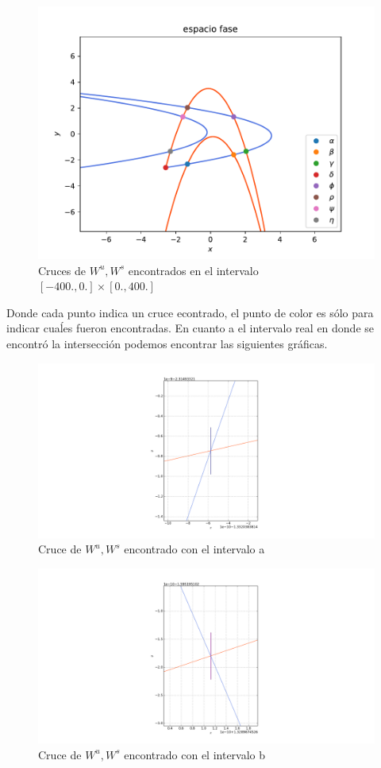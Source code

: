 \begin{figure}[H]
\centering
\includegraphics[scale=0.5]{crucesL}
\caption{Cruces de $W^{u},W^{s}$ encontrados en el intervalo $[-400.,0.] \times [0.,400.]$ }
\label{cruces}
\end{figure}

Donde cada punto indica un cruce econtrado, el punto de color es sólo para indicar cuaĺes fueron encontradas. En cuanto a el intervalo real en donde se encontró la intersección podemos encontrar las siguientes gráficas.


\begin{figure}[H]
\centering
\includegraphics[scale=0.4]{cruce1}
\caption{Cruce de $W^{u},W^{s}$ encontrado con el intervalo a}
\label{cruce1}
\end{figure}

\begin{figure}[H]
\centering
\includegraphics[scale=0.4]{cruce2}
\caption{Cruce de $W^{u},W^{s}$ encontrado con el intervalo b}
\label{cruce2}
\end{figure}


